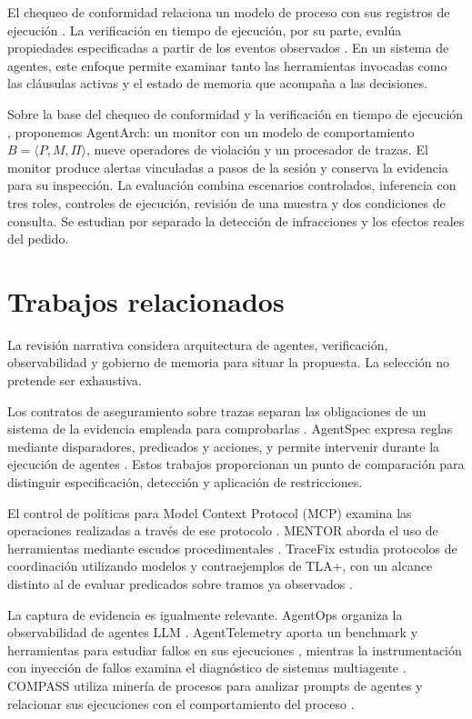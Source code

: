 \documentclass[conference]{IEEEtran}
\begin{document}
El chequeo de conformidad relaciona un modelo de proceso con sus registros de ejecución \cite{conformance}. La verificación en tiempo de ejecución, por su parte, evalúa propiedades especificadas a partir de los eventos observados \cite{rv}. En un sistema de agentes, este enfoque permite examinar tanto las herramientas invocadas como las cláusulas activas y el estado de memoria que acompaña a las decisiones.

Sobre la base del chequeo de conformidad y la verificación en tiempo de ejecución \cite{conformance,rv}, proponemos AgentArch: un monitor con un modelo de comportamiento \(B=\langle P,M,\Pi\rangle\), nueve operadores de violación y un procesador de trazas. El monitor produce alertas vinculadas a pasos de la sesión y conserva la evidencia para su inspección. La evaluación combina escenarios controlados, inferencia con tres roles, controles de ejecución, revisión de una muestra y dos condiciones de consulta. Se estudian por separado la detección de infracciones y los efectos reales del pedido.

\section{Trabajos relacionados}
La revisión narrativa considera arquitectura de agentes, verificación, observabilidad y gobierno de memoria para situar la propuesta. La selección no pretende ser exhaustiva.

Los contratos de aseguramiento sobre trazas separan las obligaciones de un sistema de la evidencia empleada para comprobarlas \cite{contracts}. AgentSpec expresa reglas mediante disparadores, predicados y acciones, y permite intervenir durante la ejecución de agentes \cite{agentspec}. Estos trabajos proporcionan un punto de comparación para distinguir especificación, detección y aplicación de restricciones.

El control de políticas para Model Context Protocol (MCP) examina las operaciones realizadas a través de ese protocolo \cite{mcp}. MENTOR aborda el uso de herramientas mediante escudos procedimentales \cite{mentor}. TraceFix estudia protocolos de coordinación utilizando modelos y contraejemplos de TLA+, con un alcance distinto al de evaluar predicados sobre tramos ya observados \cite{tracefix}.

La captura de evidencia es igualmente relevante. AgentOps organiza la observabilidad de agentes LLM \cite{agentops}. AgentTelemetry aporta un benchmark y herramientas para estudiar fallos en sus ejecuciones \cite{telemetry}, mientras la instrumentación con inyección de fallos examina el diagnóstico de sistemas multiagente \cite{faults}. COMPASS utiliza minería de procesos para analizar prompts de agentes y relacionar sus ejecuciones con el comportamiento del proceso \cite{compass}.
\end{document}
